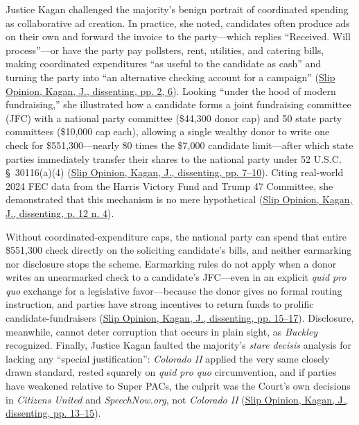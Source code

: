 \documentclass[12pt]{article}
\begin{document}
Justice Kagan challenged the majority's benign portrait of coordinated spending as collaborative ad creation. In practice, she noted, candidates often produce ads on their own and forward the invoice to the party---which replies ``Received. Will process''---or have the party pay pollsters, rent, utilities, and catering bills, making coordinated expenditures ``as useful to the candidate as cash'' and turning the party into ``an alternative checking account for a campaign'' (\href{https://www.supremecourt.gov/opinions/25pdf/24-621_h315.pdf}{Slip Opinion, Kagan, J., dissenting, pp. 2, 6}). Looking ``under the hood of modern fundraising,'' she illustrated how a candidate forms a joint fundraising committee (JFC) with a national party committee (\$44,300 donor cap) and 50 state party committees (\$10,000 cap each), allowing a single wealthy donor to write one check for \$551,300---nearly 80 times the \$7,000 candidate limit---after which state parties immediately transfer their shares to the national party under 52 U.S.C. \S~30116(a)(4) (\href{https://www.supremecourt.gov/opinions/25pdf/24-621_h315.pdf}{Slip Opinion, Kagan, J., dissenting, pp. 7--10}). Citing real-world 2024 FEC data from the Harris Victory Fund and Trump 47 Committee, she demonstrated that this mechanism is no mere hypothetical (\href{https://www.supremecourt.gov/opinions/25pdf/24-621_h315.pdf}{Slip Opinion, Kagan, J., dissenting, p. 12 n. 4}).

Without coordinated-expenditure caps, the national party can spend that entire \$551,300 check directly on the soliciting candidate's bills, and neither earmarking nor disclosure stops the scheme. Earmarking rules do not apply when a donor writes an unearmarked check to a candidate's JFC---even in an explicit \textit{quid pro quo} exchange for a legislative favor---because the donor gives no formal routing instruction, and parties have strong incentives to return funds to prolific candidate-fundraisers (\href{https://www.supremecourt.gov/opinions/25pdf/24-621_h315.pdf}{Slip Opinion, Kagan, J., dissenting, pp. 15--17}). Disclosure, meanwhile, cannot deter corruption that occurs in plain sight, as \textit{Buckley} recognized. Finally, Justice Kagan faulted the majority's \textit{stare decisis} analysis for lacking any ``special justification'': \textit{Colorado II} applied the very same closely drawn standard, rested squarely on \textit{quid pro quo} circumvention, and if parties have weakened relative to Super PACs, the culprit was the Court's own decisions in \textit{Citizens United} and \textit{SpeechNow.org}, not \textit{Colorado II} (\href{https://www.supremecourt.gov/opinions/25pdf/24-621_h315.pdf}{Slip Opinion, Kagan, J., dissenting, pp. 13--15}).
\end{document}
